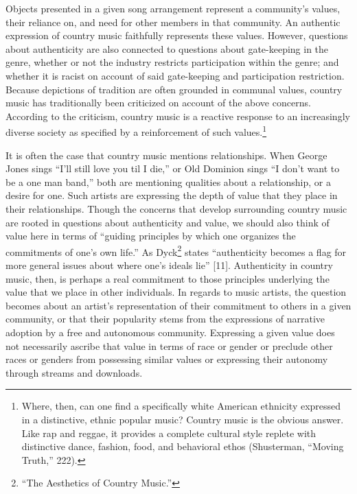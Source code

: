 \documentclass[
  12pt,
]{book}
\theoremstyle{definition}
\theoremstyle{definition}
\theoremstyle{definition}
\theoremstyle{definition}
\theoremstyle{remark}
\begin{document}
Objects presented in a given song arrangement represent a community's values, their reliance on, and need for other members in that community. An authentic expression of country music faithfully represents these values. However, questions about authenticity are also connected to questions about gate-keeping in the genre, whether or not the industry restricts participation within the genre; and whether it is racist on account of said gate-keeping and participation restriction. Because depictions of tradition are often grounded in communal values, country music has traditionally been criticized on account of the above concerns. According to the criticism, country music is a reactive response to an increasingly diverse society as specified by a reinforcement of such values.\footnote{Where, then, can one find a specifically white American ethnicity expressed in a distinctive, ethnic popular music? Country music is the obvious answer. Like rap and reggae, it provides a complete cultural style replete with distinctive dance, fashion, food, and behavioral ethos (Shusterman, {``Moving {Truth},''} 222).}

It is often the case that country music mentions relationships. When George Jones sings ``I'll still love you til I die,'' or Old Dominion sings ``I don't want to be a one man band,'' both are mentioning qualities about a relationship, or a desire for one. Such artists are expressing the depth of value that they place in their relationships. Though the concerns that develop surrounding country music are rooted in questions about authenticity and value, we should also think of value here in terms of ``guiding principles by which one organizes the commitments of one's own life.'' As Dyck\footnote{{``The Aesthetics of Country Music.''}} states ``authenticity becomes a flag for more general issues about where one's ideals lie'' {[}11{]}. Authenticity in country music, then, is perhaps a real commitment to those principles underlying the value that we place in other individuals. In regards to music artists, the question becomes about an artist's representation of their commitment to others in a given community, or that their popularity stems from the expressions of narrative adoption by a free and autonomous community. Expressing a given value does not necessarily ascribe that value in terms of race or gender or preclude other races or genders from possessing similar values or expressing their autonomy through streams and downloads.
\end{document}
